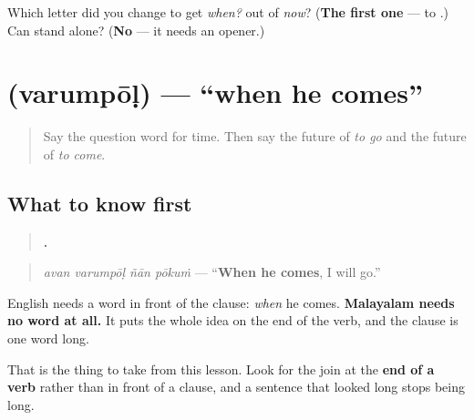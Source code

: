 \begin{tcolorbox}[breakable,colback=teal!4,colframe=teal!35!black,title={Before you move on}]
Which letter did you change to get \emph{when?} out of \emph{now}? (\textbf{The first one} —  to .) Can  stand alone? (\textbf{No} — it needs an opener.)
\end{tcolorbox}
\section[\texorpdfstring{\ml{വരുമ്പോൾ} (varumpōḷ)}{വരുമ്പോൾ (varumpōḷ)}]{ (varumpōḷ) — \textquotedblleft{}when he comes\textquotedblright{}}

\label{lesson:ML-C75-umbol}



\begin{quote}
Say the question word for time. Then say the future of \emph{to go} and the future of \emph{to come}.
\end{quote}

\subsection*{What to know first}
\begin{quote}
\textbf{   .}
\end{quote}

\begin{quote}
\emph{avan varumpōḷ ñān pōkuṁ} — \textquotedblleft{}\textbf{When he comes}, I will go.\textquotedblright{}
\end{quote}

English needs a word in front of the clause: \emph{when} he comes. \textbf{Malayalam needs no word at all.} It puts the whole idea on the end of the verb, and the clause is one word long.

That is the thing to take from this lesson. Look for the join at the \textbf{end of a verb} rather than in front of a clause, and a sentence that looked long stops being long.

